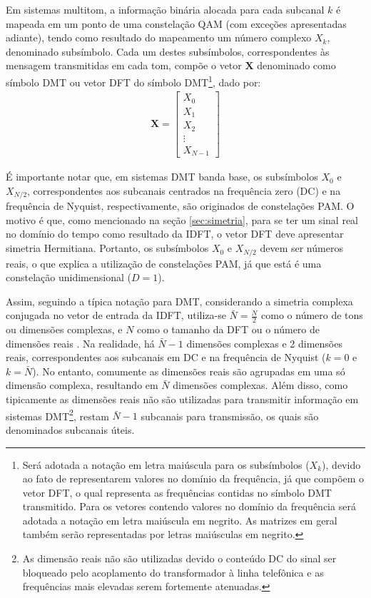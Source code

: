 Em sistemas multitom, a informação binária alocada para cada subcanal $k$ é mapeada em um ponto de uma constelação QAM (com exceções apresentadas adiante), tendo como resultado do mapeamento um número complexo $X_k$, denominado subsímbolo. Cada um destes subsímbolos, correspondentes às mensagem transmitidas em cada tom, compõe o vetor $\mathbf{X}$ denominado como símbolo DMT ou vetor DFT do símbolo DMT\footnote{Será adotada a notação em letra maiúscula para os subsímbolos ($X_k$), devido ao fato de representarem valores no domínio da frequência, já que compõem o vetor DFT, o qual representa as frequências contidas no símbolo DMT transmitido. Para os vetores contendo valores no domínio da frequência será adotada a notação em letra maiúscula em negrito. As matrizes em geral também serão representadas por letras maiúsculas em negrito.}, dado por:
\begin{align}
\mathbf{X} = \left[ \begin{array}{c} X_0\\ X_1\\ X_2\\ \vdots \\ X_{N-1}\end{array}\right]
\end{align}

É importante notar que, em sistemas DMT banda base, os subsímbolos $X_0$ e $X_{N/2}$, correspondentes aos subcanais centrados na frequência zero (DC) e na frequência de Nyquist, respectivamente, são originados de constelações PAM. O motivo é que, como mencionado na seção \ref{sec:simetria}, para se ter um sinal real no domínio do tempo como resultado da IDFT, o vetor DFT deve apresentar simetria Hermitiana. Portanto, os subsímbolos $X_0$ e $X_{N/2}$ devem ser números reais, o que explica a utilização de constelações PAM, já que está é uma constelação unidimensional ($D=1$).

Assim, seguindo a típica notação para DMT, considerando a simetria complexa conjugada no vetor de entrada da IDFT, utiliza-se $\bar{N} = \frac{N}{2}$ como o número de tons ou dimensões complexas, e $N$ como o tamanho da DFT ou o número de dimensões reais \cite{ee379c}. Na realidade, há $\bar{N} -1$ dimensões complexas e 2 dimensões reais, correspondentes aos subcanais em DC e na frequência de Nyquist ($k=0$ e $k=\bar{N}$). No entanto, comumente as dimensões reais são agrupadas em uma só dimensão complexa, resultando em $\bar{N}$ dimensões complexas. Além disso, como tipicamente as dimensões reais não são utilizadas para transmitir informação em sistemas DMT\footnote{As dimensão reais não são utilizadas devido o conteúdo DC do sinal ser bloqueado pelo acoplamento do transformador à linha telefônica e as frequências mais elevadas serem fortemente atenuadas.}, restam $\bar{N} -1$ subcanais para transmissão, os quais são denominados subcanais úteis.

